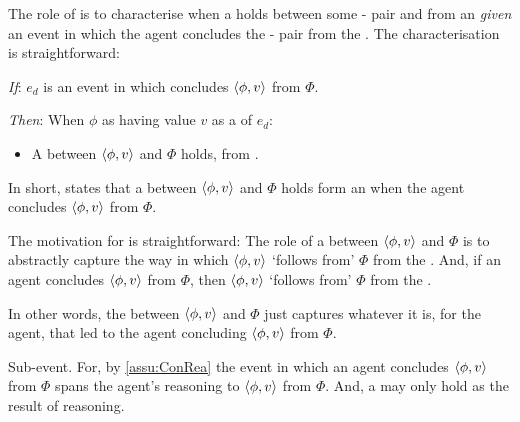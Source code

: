 \begin{note}
  The role of \supportI{} is to characterise when a \ros{} holds between some - pair and \pool{} from an \agpe{} \emph{given} an event in which the agent concludes the - pair from the \pool{}.
  The characterisation is straightforward:

  \begin{idea}[\supportI{}]
    \label{idea:support}
    \vspace{-\baselineskip}
    \begin{itenum}
    \item[\emph{If}:]
      \(e_{d}\) is an event in which \vAgent{} concludes \(\langle \phi, v \rangle\) from \(\Phi\).
    \item[\emph{Then}:]
      When \vAgent{}  \(\phi\) as having value \(v\) as a  of \(e_{d}\):
      \begin{itemize}
      \item
        A \emph{\ros{}} between \(\langle \phi, v \rangle\) and \(\Phi\) holds, from .
      \end{itemize}
    \end{itenum}
    \vspace{-\baselineskip}
  \end{idea}

  \noindent%
  In short, \supportI{} states that a \ros{} between \(\langle \phi, v \rangle\) and \(\Phi\) holds form an \agpe{} when the agent concludes \(\langle \phi, v \rangle\) from \(\Phi\).

  The motivation for \supportI{} is straightforward:
  The role of  a \ros{} between \(\langle \phi, v \rangle\) and \(\Phi\) is to abstractly capture the way in which \(\langle \phi, v \rangle\) `follows from' \(\Phi\) from the \agpe{}.
  And, if an agent concludes \(\langle \phi, v \rangle\) from \(\Phi\), then \(\langle \phi, v \rangle\) `follows from' \(\Phi\) from the \agpe{}.

  In other words, the \ros{} between \(\langle \phi, v \rangle\) and \(\Phi\) just captures whatever it is, for the agent, that led to the agent concluding \(\langle \phi, v \rangle\) from \(\Phi\).
\end{note}


\begin{note}
  Sub-event.
  For, by \autoref{assu:ConRea} the event in which an agent concludes \(\langle \phi, v \rangle\) from \(\Phi\) spans the agent's reasoning to \(\langle \phi, v \rangle\) from \(\Phi\).
  And, a \ros{} may only hold as the result of reasoning.
\end{note}


